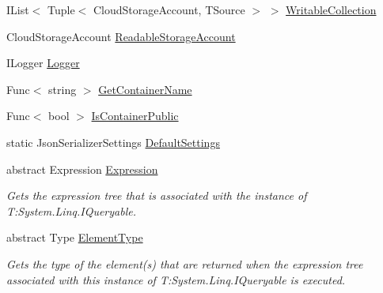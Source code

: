 \begin{DoxyCompactItemize}
\item 
I\+List$<$ Tuple$<$ Cloud\+Storage\+Account, T\+Source $>$ $>$ \hyperlink{classCqrs_1_1Azure_1_1BlobStorage_1_1StorageStore_aece11e874587ca60913d275079dfc13c}{Writable\+Collection}
\item 
Cloud\+Storage\+Account \hyperlink{classCqrs_1_1Azure_1_1BlobStorage_1_1StorageStore_af0e0bcba6758fda015f51b07eb464b14}{Readable\+Storage\+Account}
\item 
I\+Logger \hyperlink{classCqrs_1_1Azure_1_1BlobStorage_1_1StorageStore_acb1c7917bb897f51685d367b035ee119}{Logger}
\item 
Func$<$ string $>$ \hyperlink{classCqrs_1_1Azure_1_1BlobStorage_1_1StorageStore_acc1c1e865c9a59772a29cfe44d39e48a}{Get\+Container\+Name}
\item 
Func$<$ bool $>$ \hyperlink{classCqrs_1_1Azure_1_1BlobStorage_1_1StorageStore_a80dc0d2697bbd1e652d5194df8744ae8}{Is\+Container\+Public}
\item 
static Json\+Serializer\+Settings \hyperlink{classCqrs_1_1Azure_1_1BlobStorage_1_1StorageStore_ac5c27123fd0bf4d926a4865e2d6b0bdd}{Default\+Settings}
\item 
abstract Expression \hyperlink{classCqrs_1_1Azure_1_1BlobStorage_1_1StorageStore_a21c204b514718b8af550ce2a627c4b70}{Expression}
\begin{DoxyCompactList}\small\item\em Gets the expression tree that is associated with the instance of T\+:\+System.\+Linq.\+I\+Queryable. \end{DoxyCompactList}\item 
abstract Type \hyperlink{classCqrs_1_1Azure_1_1BlobStorage_1_1StorageStore_af298920154f31a7d0117facbb2f7cd54}{Element\+Type}
\begin{DoxyCompactList}\small\item\em Gets the type of the element(s) that are returned when the expression tree associated with this instance of T\+:\+System.\+Linq.\+I\+Queryable is executed. \end{DoxyCompactList}\item 

\end{DoxyCompactItemize}
